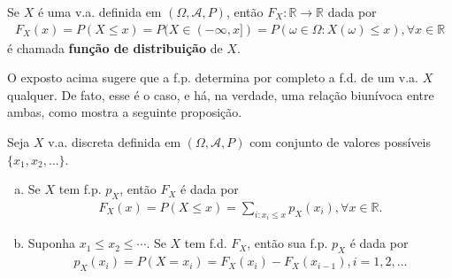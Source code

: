 \documentclass[../Notas.tex]{subfiles}
\begin{document}
\begin{definition}
Se $X$ é uma v.a. definida em $(\Omega, \mathcal{A}, P)$, então $F_X:\mathbb{R}\to\mathbb{R}$ dada por
\begin{align*}
    F_X(x) = P(X\leq x) = P(X\in (-\infty, x]) = P(\omega\in\Omega : X(\omega)\leq x), \forall x\in\mathbb{R}
\end{align*}
é chamada \textbf{função de distribuição} de $X$.
\end{definition}
O exposto acima sugere que a f.p. determina por completo a f.d. de um v.a. $X$ qualquer. De fato, esse é o caso, e há, na verdade, uma relação biunívoca entre ambas, como mostra a seguinte proposição.
\begin{proposition}
Seja $X$ v.a. discreta definida em $(\Omega, \mathcal{A}, P)$ com conjunto de valores possíveis $\{ x_1, x_2, \dots \}$.
\begin{enumerate}[(a)]
    \item Se $X$ tem f.p. $p_X$, então $F_X$ é dada por
    \begin{align*}
        F_X(x) = P(X\leq x) = \sum_{i: x_i\leq x}p_X(x_i), \forall x\in\mathbb{R}.
    \end{align*}
    \item Suponha $x_1\leq x_2\leq\cdots$. Se $X$ tem f.d. $F_X$, então sua f.p. $p_X$ é dada por
    \begin{align*}
        p_X(x_i) = P(X=x_i) = F_X(x_i) - F_X(x_{i-1}), i = 1, 2, \dots
    \end{align*}
\end{enumerate}
\end{proposition}
\end{document}
